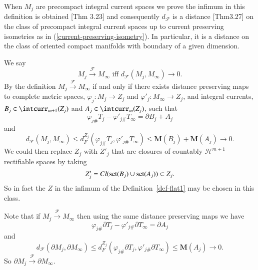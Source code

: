 \documentclass[12pt]{amsart}
\begin{document}
When $M_j$ are precompact integral current spaces
 we prove the infimum in this definition
is obtained \cite{SorWen2}[Thm 3.23] and consequently
$d_\mathcal{F}$ is a distance \cite{SorWen2}[Thm3.27] on the class of precompact integral current spaces up to
current preserving isometries as in (\ref{current-preserving-isometry}).
In particular, it is a distance on the class of oriented compact manifolds with boundary of a given dimension.

We say 
\begin{equation}
M_j {\stackrel {\mathcal{F}}{\longrightarrow} } M_\infty \textrm{ iff } d_{\mathcal{F}}(M_j, M_\infty) \to 0.
\end{equation}
By the definition $M_j {\stackrel {\mathcal{F}}{\longrightarrow} } M_\infty$ if and only if 
there exists distance preserving maps to complete metric spaces, 
$\varphi_j: M_j \to Z_j$ and $\varphi'_j: M_\infty \to Z_j$, and integral
currents, $B_j \in \intcurr_{m+1}(Z_j)$ and $A_j \in \intcurr_{m}(Z_j)$,
such that 
\begin{equation}
\varphi_{j\#} T_j -\varphi'_{j\#} T_\infty= \partial B_j + A_j
\end{equation}
and
\begin{equation}
d_{\mathcal{F}}(M_j, M_\infty)\le d_F^{Z_j}
\left(\varphi_{j\#} T_j, \varphi'_{j\#} T_\infty \right)\le 
{{\mathbf M}}(B_j)+{{\mathbf M}}(A_j) \to 0.
\end{equation}
We could then replace $Z_j$ with $Z'_j$ that are closures of countably
$\mathcal{H}^{m+1}$ rectifiable spaces by taking 
\begin{equation} \label{Zj-here}
Z'_j=Cl({{\rm{set}}}(B_j) \cup {{\rm{set}}}(A_j)) \subset Z_j.
\end{equation}
So in fact the $Z$ in the infimum of the Definition~\ref{def-flat1} may
be chosen in this class.

Note that if $M_j {\stackrel {\mathcal{F}}{\longrightarrow} } M_\infty$ then using the same distance preserving
maps we have
\begin{equation} \label{bndry-1}
\varphi_{j\#} \partial T_j -\varphi'_{j\#} \partial T_\infty= \partial A_j
\end{equation}
and
\begin{equation} \label{bndry-2}
d_{\mathcal{F}}(\partial M_j, \partial M_\infty)\le d_F^{Z_j}
\left(\varphi_{j\#} \partial T_j, \varphi'_{j\#} \partial T_\infty \right)\le 
{{\mathbf M}}(A_j) \to 0.
\end{equation}
So $\partial M_j {\stackrel {\mathcal{F}}{\longrightarrow} } \partial M_\infty$.
\end{document}
